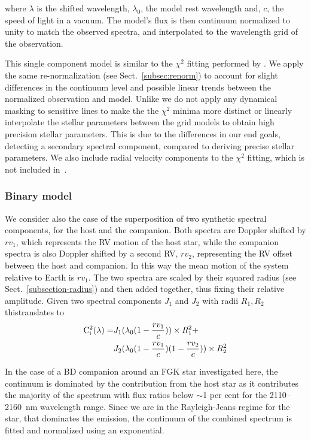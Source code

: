 \documentclass[fleqn,usenatbib]{mnras}
\newcommand*\bl{\color{blue}}
\begin{document}
    where \(\lambda\) is the shifted wavelength, \(\lambda_0\), the model rest wavelength and, \(c\), the speed of light in a vacuum. The model's flux is then continuum normalized to unity to match the observed spectra, and interpolated to the wavelength grid of the observation.
    
    This single component model is similar to the \(\chi^2\) fitting performed by \citet{passegger_fundamental_2016}. We apply the same re-normalization (see Sect.~\ref{subsec:renorm}) to account for slight differences in the continuum level and possible linear trends between the normalized observation and model. Unlike \citet{passegger_fundamental_2016} we do not apply any dynamical masking to sensitive lines to make the the \(\chi^2\) minima more distinct or linearly interpolate the stellar parameters between the grid models to obtain high precision stellar parameters. This is due to the differences in our end goals, detecting a secondary spectral component, compared to deriving precise stellar parameters. We also include radial velocity components to the \(\chi^2\) fitting, which is not included in~\citet{passegger_fundamental_2016}.
    
    \subsubsection{Binary model}
    \label{subsubsec:binary-model}
    {\bl We consider also the case of} the superposition of two synthetic spectral components, for the host and the companion. Both spectra are Doppler shifted by \({rv}_1\), which represents the RV motion of the host star, while the companion spectra is also Doppler shifted by a second RV, \({rv}_2\), representing the RV offset between the host and companion. In this way the mean motion of the system relative to Earth is \({rv}_1\). The two spectra are scaled by their squared radius (see Sect.~\ref{subsection-radius}) and then added together, thus fixing their relative amplitude.
    Given two spectral components \(J_{1}\) and \(J_{2}\) with radii \(R_1, R_2\) this{\bl translates} to
    \begin{align}
    \rm C^{2}_{i}(\lambda) = &  J_{1}(\lambda_{0}(1 - \frac{rv_{1}}{c}))\times R_{1}^2 +\nonumber \\
    & J_{2}(\lambda_{0}(1-\frac{rv_{1}}{c})(1-\frac{rv_{2}}{c}))\times R_{2}^2
    \end{align}
    
    In the case of a BD companion around an FGK star investigated here, the continuum is dominated by the contribution from the host star as it contributes the majority of the spectrum with flux ratios below \(\sim\)1 per cent for the 2110--2160~nm wavelength range. {\bl Since we are in the Rayleigh-Jeans regime for the star, that dominates the emission, the continuum of the combined spectrum is fitted and normalized using an exponential.} 
    
\end{document}
